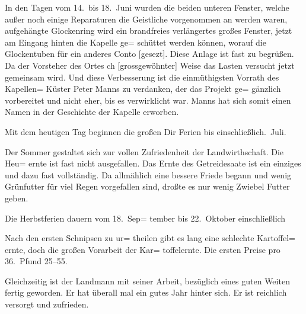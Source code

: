 

%
In den Tagen vom 14.\ bis 18.\ Juni wurden\ob
die beiden unteren Fenster, welche außer noch\ob
einige Reparaturen die Geistliche vorgenommen\ob
an werden waren, aufgehängte Glockenring\ob
wird ein brandfreies verlängertes großes\ob
Fenster, jetzt am Eingang hinten die Kapelle ge=\ob
schüttet werden können, worauf die Glockentuben\ob
für ein anderes Conto {[gesezt]}. Diese Anlage ist\ob
fast zu begrüßen. Da der Vorsteher des Ortes\ob
ch {[grossgewöhnter]} Weise das Lasten versucht jetzt\ob
gemeinsam wird. Und diese Verbesserung ist\ob
die einmüthigsten Vorrath des Kapellen= Küster\ob
Peter Manns zu verdanken, der das Projekt ge=\ob
gänzlich vorbereitet und nicht eher, bis es\ob
verwirklicht war. Manns hat sich somit einen\ob
Namen in der Geschichte der Kapelle erworben.

Mit dem heutigen Tag beginnen die\ob
großen Dir Ferien bis einschließlich.\ Juli.

%
Der Sommer gestaltet sich zur vollen\ob
Zufriedenheit der Landwirthschaft. Die Heu=\ob
ernte ist fast nicht ausgefallen. Das Ernte des\ob
Getreidesaate ist ein einziges und dazu\ob
fast vollständig. Da allmählich eine bessere\ob
Friede begann und wenig Grünfutter für\ob
viel Regen vorgefallen sind, droßte es nur\ob
wenig Zwiebel Futter geben.

%
Die Herbstferien dauern vom 18.\ Sep=\ob
tember bis 22.\ Oktober einschließlich

Nach den ersten Schnipsen zu ur=\ob
theilen gibt es lang eine schlechte Kartoffel=\ob
ernte, doch die großen Vorarbeit der Kar=\ob
toffelernte. Die ersten Preise pro 36.\ Pfund 25--55.

%
Gleichzeitig ist der Landmann mit\ob
seiner Arbeit, bezüglich eines guten Weiten\ob
fertig geworden. Er hat überall mal ein gutes\ob
Jahr hinter sich. Er ist reichlich versorgt und zufrieden.
\pend
